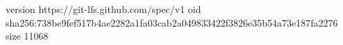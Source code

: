 version https://git-lfs.github.com/spec/v1
oid sha256:738be9fef517b4ae2282a1fa03cab2a049833422f3826e35b54a73e187fa2276
size 11068
